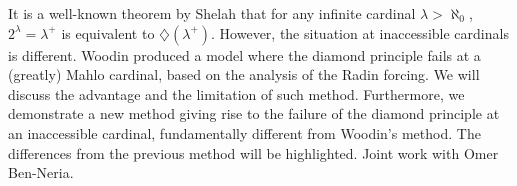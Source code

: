 \documentclass[bsl,meeting]{asl}
\newcommand{\NP}{}
\begin{document}
\thispagestyle{empty}


\NP
{}

It is a well-known theorem by Shelah that for any infinite cardinal $\lambda>\aleph_0$, $2^{\lambda}=\lambda^+$ is equivalent to $\diamondsuit(\lambda^+)$. However, the situation at inaccessible cardinals is different. Woodin produced a model where the diamond principle fails at a (greatly) Mahlo cardinal, based on the analysis of the Radin forcing.  We will discuss the advantage and the limitation of such method. Furthermore, we demonstrate a new method giving rise to the failure of the diamond principle at an inaccessible cardinal, fundamentally different from Woodin's method. The differences from the previous method will be highlighted. Joint work with Omer Ben-Neria.


\vspace*{-0.5\baselineskip}
\end{document}
